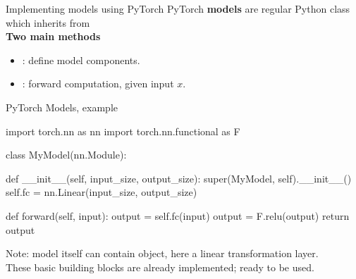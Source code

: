 \begin{frame}{Implementing models using PyTorch}
PyTorch \textbf{models} are regular Python class which inherits from \\
\vsp
\textbf{Two main methods}
\begin{itemize}
\item {}: define model components.
\item {}: forward computation, given input $x$.
\end{itemize}
\end{frame}

\begin{frame}[fragile]{PyTorch Models, example}
\vspace{-8mm}
\begin{python}
import torch.nn as nn
import torch.nn.functional as F

class MyModel(nn.Module):

    def __init__(self, input_size, output_size):
        super(MyModel, self).__init__()
        self.fc = nn.Linear(input_size, output_size)

    def forward(self, input):
        output = self.fc(input)
        output = F.relu(output)
        return output
\end{python}
Note: model itself can contain  object, here  a linear transformation layer.\\
These basic building blocks are already implemented; ready to be used.
\end{frame}

%

